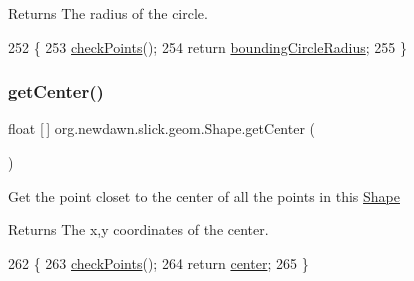 \begin{DoxyReturn}{Returns}
The radius of the circle. 
\end{DoxyReturn}

\begin{DoxyCode}
252                                            \{
253         \mbox{\hyperlink{classorg_1_1newdawn_1_1slick_1_1geom_1_1_shape_a84293802d05e8666a441720bfc12745d}{checkPoints}}();
254         \textcolor{keywordflow}{return} \mbox{\hyperlink{classorg_1_1newdawn_1_1slick_1_1geom_1_1_shape_ac89bf2b9c93a7294b49797fc7a054c11}{boundingCircleRadius}};
255     \}
\end{DoxyCode}
\mbox{\label{classorg_1_1newdawn_1_1slick_1_1geom_1_1_shape_a1c413693dcdfc64cde4e604ccc930759}} 
\subsubsection{\texorpdfstring{get\+Center()}{getCenter()}}
{\footnotesize\ttfamily float \mbox{[}$\,$\mbox{]} org.\+newdawn.\+slick.\+geom.\+Shape.\+get\+Center (\begin{DoxyParamCaption}{ }\end{DoxyParamCaption})\hspace{0.3cm}{\ttfamily [inline]}}

Get the point closet to the center of all the points in this \mbox{\hyperlink{classorg_1_1newdawn_1_1slick_1_1geom_1_1_shape}{Shape}}

\begin{DoxyReturn}{Returns}
The x,y coordinates of the center. 
\end{DoxyReturn}

\begin{DoxyCode}
262                                \{
263         \mbox{\hyperlink{classorg_1_1newdawn_1_1slick_1_1geom_1_1_shape_a84293802d05e8666a441720bfc12745d}{checkPoints}}();
264         \textcolor{keywordflow}{return} \mbox{\hyperlink{classorg_1_1newdawn_1_1slick_1_1geom_1_1_shape_a15ecde3336c4310cd927d766bb9a0b3b}{center}};
265     \}
\end{DoxyCode}
\mbox{\label{classorg_1_1newdawn_1_1slick_1_1geom_1_1_shape_aa8f8cb519727d4ef8737819b4f1dd7b6}} 
